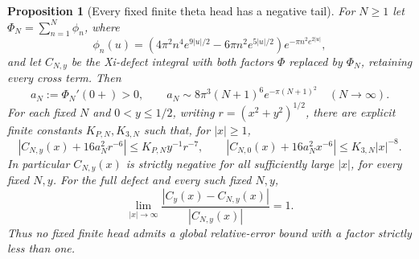\documentclass[11pt]{article}
\newtheorem{proposition}[theorem]{Proposition}
\theoremstyle{remark}\newtheorem{remark}[theorem]{Remark}
\begin{document}
\begin{proposition}[Every fixed finite theta head has a negative tail]
\label{prop:finite-theta-head}
For $N\ge1$ let $\Phi_N=\sum_{n=1}^N\phi_n$, where
\[
 \phi_n(u)=(4\pi^2n^4e^{9|u|/2}-6\pi n^2e^{5|u|/2})
                                      e^{-\pi n^2e^{2|u|}},
\]
and let $C_{N,y}$ be the Xi-defect integral with both factors
$\Phi$ replaced by $\Phi_N$, retaining every cross term.
Then
\[
 a_N:=\Phi_N'(0+)>0,\qquad
 a_N\sim8\pi^3(N+1)^6e^{-\pi(N+1)^2}\quad(N\to\infty).
                                                               \tag{TH}
\]
For each fixed $N$ and $0<y\le1/2$, writing
$r=(x^2+y^2)^{1/2}$, there are explicit finite constants
$K_{P,N},K_{3,N}$ such that, for $|x|\ge1$,
\[
 \left|C_{N,y}(x)+16a_N^2r^{-6}\right|
                       \le K_{P,N}y^{-1}r^{-7},
 \qquad
 \left|C_{N,0}(x)+16a_N^2x^{-6}\right|
                       \le K_{3,N}|x|^{-8}.             \tag{TN}
\]
In particular $C_{N,y}(x)$ is strictly negative for all
sufficiently large $|x|$, for every fixed $N,y$.
For the full defect and every such fixed $N,y$,
\[
 \lim_{|x|\to\infty}
       \frac{|C_y(x)-C_{N,y}(x)|}{|C_{N,y}(x)|}=1.       \tag{TR}
\]
Thus no fixed finite head admits a global relative-error
bound with a factor strictly less than one.
\end{proposition}
\end{document}
